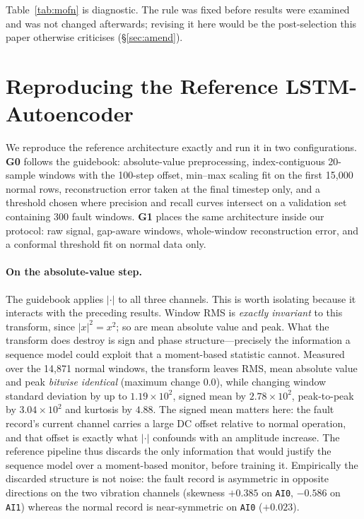 \documentclass{article}
\begin{document}
Table~\ref{tab:mofn} is diagnostic. The rule was fixed before results were
examined and was not changed afterwards; revising it here would be the
post-selection this paper otherwise criticises (\S\ref{sec:amend}).

\section{Reproducing the Reference LSTM-Autoencoder}
\label{sec:bl1}

We reproduce the reference architecture exactly and run it in two
configurations. \textbf{G0} follows the guidebook: absolute-value
preprocessing, index-contiguous 20-sample windows with the 100-step offset,
min--max scaling fit on the first 15{,}000 normal rows, reconstruction error
taken at the final timestep only, and a threshold chosen where precision and
recall curves intersect on a validation set containing 300 fault windows.
\textbf{G1} places the same architecture inside our protocol: raw signal,
gap-aware windows, whole-window reconstruction error, and a conformal
threshold fit on normal data only.

\paragraph{On the absolute-value step.} The guidebook applies $|\cdot|$ to all
three channels. This is worth isolating because it interacts with the
preceding results. Window RMS is \emph{exactly invariant} to this transform,
since $|x|^2 = x^2$; so are mean absolute value and peak. What the transform
does destroy is sign and phase structure---precisely the information a
sequence model could exploit that a moment-based statistic cannot. Measured
over the 14{,}871 normal windows, the transform leaves RMS, mean absolute
value and peak \emph{bitwise identical} (maximum change $0.0$), while changing
window standard deviation by up to $1.19\times10^{2}$, signed mean by
$2.78\times10^{2}$, peak-to-peak by $3.04\times10^{2}$ and kurtosis by $4.88$.
The signed mean matters here: the fault record's current channel carries a
large DC offset relative to normal operation, and that offset is exactly what
$|\cdot|$ confounds with an amplitude increase. The reference pipeline thus
discards the only information that would justify the sequence model over a
moment-based monitor, before training it. Empirically the discarded structure
is not noise: the fault record is asymmetric in opposite directions on the two
vibration channels (skewness $+0.385$ on \texttt{AI0}, $-0.586$ on
\texttt{AI1}) whereas the normal record is near-symmetric on \texttt{AI0}
($+0.023$).
\end{document}

